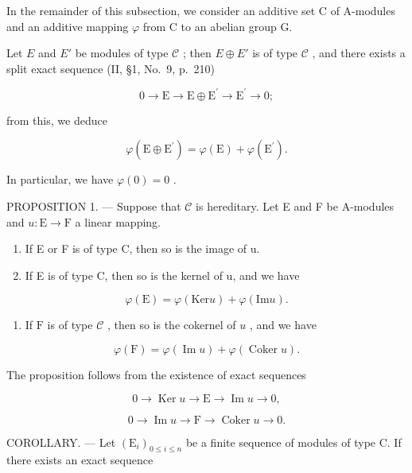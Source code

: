 In the remainder of this subsection, we consider an additive set C of A-modules and an additive mapping \(\varphi\) from C to an abelian group G.

Let \(E\) and \(E'\) be modules of type \(\mathcal{C}\) ; then \(E \oplus E'\) is of type \(\mathcal{C}\) , and there exists a split exact sequence (II, §1, No.~9, p.~210)

\[
0 \longrightarrow \mathrm{E} \longrightarrow \mathrm{E} \oplus \mathrm{E} ^ {\prime} \longrightarrow \mathrm{E} ^ {\prime} \longrightarrow 0;
\]

from this, we deduce

\[
\varphi (\mathrm{E} \oplus \mathrm{E} ^ {\prime}) = \varphi (\mathrm{E}) + \varphi (\mathrm{E} ^ {\prime}).\tag{1}
\]

In particular, we have \(\varphi(0) = 0\) .

PROPOSITION 1. --- Suppose that \(\mathcal{C}\) is hereditary. Let E and F be A-modules and \(u: \mathrm{E} \to \mathrm{F}\) a linear mapping.

\begin{enumerate}
\def\labelenumi{\alph{enumi})}
\item
  If E or F is of type C, then so is the image of u.
\item
  If E is of type C, then so is the kernel of u, and we have
\end{enumerate}

\[
\varphi (\mathrm{E}) = \varphi (\mathrm{Ker} u) + \varphi (\mathrm{Im} u).\tag{2}
\]

\begin{enumerate}
\def\labelenumi{\alph{enumi})}
\setcounter{enumi}{2}
\tightlist
\item
  If \(\mathrm{F}\) is of type \(\mathcal{C}\) , then so is the cokernel of \(u\) , and we have
\end{enumerate}

\[
\varphi (\mathrm{F}) = \varphi (\operatorname{Im} u) + \varphi (\operatorname{Coker} u).\tag{3}
\]

The proposition follows from the existence of exact sequences

\[
0 \longrightarrow \operatorname{Ker} u \longrightarrow \mathrm{E} \longrightarrow \operatorname{Im} u \longrightarrow 0,
\]

\[
0 \longrightarrow \operatorname{Im} u \longrightarrow \mathrm{F} \longrightarrow \operatorname{Coker} u \longrightarrow 0.
\]

COROLLARY. --- Let \((\mathrm{E}_{i})_{0\leqslant i\leqslant n}\) be a finite sequence of modules of type C. If there exists an exact sequence

